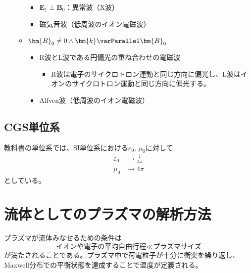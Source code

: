 \begin{itemize}
\begin{itemize}
\begin{itemize}
			            \item $\bm{E}_1 \perp \bm{B}_0$：異常波（X波）
			            \item 磁気音波（低周波のイオン電磁波）
		            \end{itemize}
		      \item $\bm{B}_0 \neq 0 \wedge \bm{k}\varParallel \bm{B}_0$
		            \begin{itemize}
			            \item R波とL波である円偏光の重ね合わせの電磁波
			                  \begin{itemize}
				                  \item R波は電子のサイクロトロン運動と同じ方向に偏光し、L波はイオンのサイクロトロン運動と同じ方向に偏光する。
			                  \end{itemize}
			            \item Alfven波（低周波のイオン電磁波）
		            \end{itemize}
	      \end{itemize}
\end{itemize}


\subsection{CGS単位系}
教科書の単位系では、SI単位系における$\varepsilon_0,\,\mu_0$に対して
\begin{align}
	\varepsilon_0 & \to \frac{1}{4\pi} \\
	\mu_0         & \to 4\pi
\end{align}
としている。

\newpage
\section{流体としてのプラズマの解析方法}
プラズマが流体みなせるための条件は
\begin{equation}
	\text{イオンや電子の平均自由行程}\ll\text{プラズマサイズ}
\end{equation}
が満たされることである。プラズマ中で荷電粒子が十分に衝突を繰り返し、Maxwell分布での平衡状態を達成することで温度が定義される。
